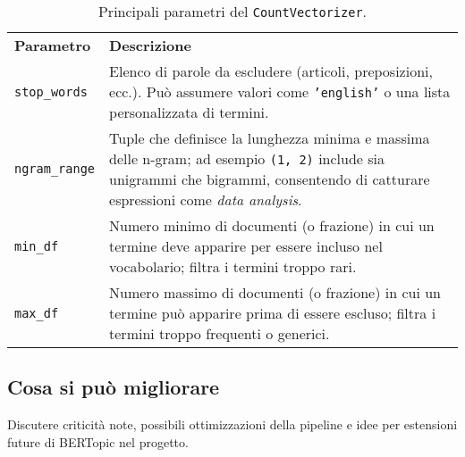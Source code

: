 \begin{table}[H]
\centering
\begin{tabular}{p{3cm} p{9cm}}
\textbf{Parametro} & \textbf{Descrizione} \\
\texttt{stop\_words} & Elenco di parole da escludere (articoli, preposizioni, ecc.). Può assumere valori come \texttt{'english'} o una lista personalizzata di termini. \\
\texttt{ngram\_range} & Tuple che definisce la lunghezza minima e massima delle n-gram; ad esempio \texttt{(1, 2)} include sia unigrammi che bigrammi, consentendo di catturare espressioni come \textit{data analysis}. \\
\texttt{min\_df} & Numero minimo di documenti (o frazione) in cui un termine deve apparire per essere incluso nel vocabolario; filtra i termini troppo rari. \\
\texttt{max\_df} & Numero massimo di documenti (o frazione) in cui un termine può apparire prima di essere escluso; filtra i termini troppo frequenti o generici. \\
\end{tabular}
\caption{Principali parametri del \texttt{CountVectorizer}.}
\end{table}

\subsection{Cosa si può migliorare}
Discutere criticità note, possibili ottimizzazioni della pipeline e idee per estensioni future di BERTopic nel progetto.